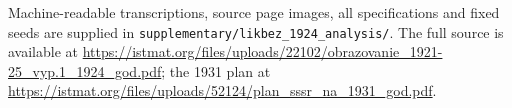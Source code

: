 Machine-readable transcriptions, source page images, all specifications
and fixed seeds are supplied in \texttt{supplementary/likbez\_1924\_analysis/}.
The full source is available at
\url{https://istmat.org/files/uploads/22102/obrazovanie_1921-25_vyp.1_1924_god.pdf};
the 1931 plan at
\url{https://istmat.org/files/uploads/52124/plan_sssr_na_1931_god.pdf}.
